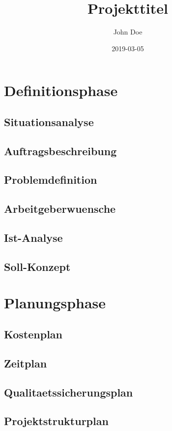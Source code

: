\documentclass[11pt, a4paper]{article}
\title{Projekttitel}
\date{2019-03-05}
\author{John Doe}
\begin{document}
  \maketitle
  \newpage

  \tableofcontents
  \newpage


  \section{Definitionsphase}
    \subsection{Situationsanalyse}
    \subsection{Auftragsbeschreibung}
    \subsection{Problemdefinition}
    \subsection{Arbeitgeberwuensche}
    \subsection{Ist-Analyse}
    \subsection{Soll-Konzept}
    \newpage

  \section{Planungsphase}
    \subsection{Kostenplan}
    \subsection{Zeitplan}
    \subsection{Qualitaetssicherungsplan}
    \subsection{Projektstrukturplan}
    \newpage
\end{document}
